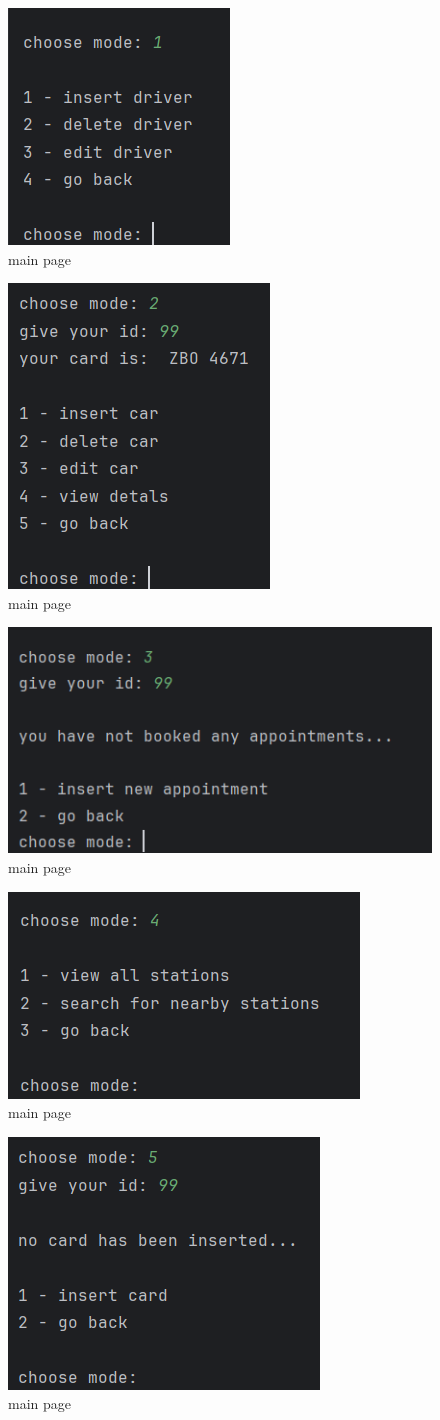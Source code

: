 \documentclass[manuscript,screen,review]{acmart}
\newcommand{\en}[1]{\foreignlanguage{english}{#1}}
\begin{document}
\begin{figure}[H]
    \centering
    \includegraphics[width=.3\textwidth]{./db_edit_2.png}
    \caption{\en{main page}}
\end{figure}

\begin{figure}[H]
    \centering
    \includegraphics[width=.4\textwidth]{./db_edit_3.png}
    \caption{\en{main page}}
\end{figure}

\begin{figure}[H]
    \centering
    \includegraphics[width=.4\textwidth]{./db_edit_5.png}
    \caption{\en{main page}}
\end{figure}

\begin{figure}[H]
    \centering
    \includegraphics[width=.4\textwidth]{./db_edit_4.png}
    \caption{\en{main page}}
\end{figure}

\begin{figure}[H]
    \centering
    \includegraphics[width=.4\textwidth]{./db_edit_6.png}
    \caption{\en{main page}}
\end{figure}
\end{document}
